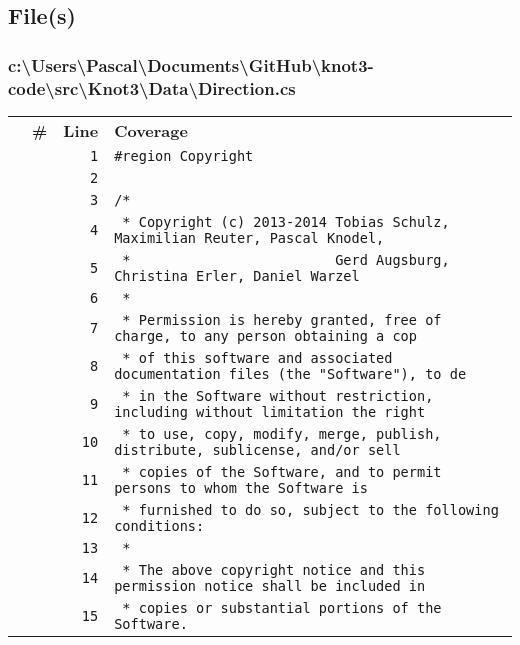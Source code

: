 \documentclass[a4paper,10pt]{article}
\begin{document}
\subsection{File(s)}
\subsubsection{c:\textbackslash Users\textbackslash Pascal\textbackslash Documents\textbackslash GitHub\textbackslash knot3-code\textbackslash src\textbackslash Knot3\textbackslash Data\textbackslash Direction.cs}
\begin{longtable}[l]{lrrl}
\textbf{} & \textbf{\#} & \textbf{Line} & \textbf{Coverage}\\
\cellcolor{gray} &  & \verb~1~ & \verb~#region Copyright~\\
\cellcolor{gray} &  & \verb~2~ & \verb~~\\
\cellcolor{gray} &  & \verb~3~ & \verb~/*~\\
\cellcolor{gray} &  & \verb~4~ & \verb~ * Copyright (c) 2013-2014 Tobias Schulz, Maximilian Reuter, Pascal Knodel,~\\
\cellcolor{gray} &  & \verb~5~ & \verb~ *                         Gerd Augsburg, Christina Erler, Daniel Warzel~\\
\cellcolor{gray} &  & \verb~6~ & \verb~ *~\\
\cellcolor{gray} &  & \verb~7~ & \verb~ * Permission is hereby granted, free of charge, to any person obtaining a cop~\\
\cellcolor{gray} &  & \verb~8~ & \verb~ * of this software and associated documentation files (the "Software"), to de~\\
\cellcolor{gray} &  & \verb~9~ & \verb~ * in the Software without restriction, including without limitation the right~\\
\cellcolor{gray} &  & \verb~10~ & \verb~ * to use, copy, modify, merge, publish, distribute, sublicense, and/or sell~\\
\cellcolor{gray} &  & \verb~11~ & \verb~ * copies of the Software, and to permit persons to whom the Software is~\\
\cellcolor{gray} &  & \verb~12~ & \verb~ * furnished to do so, subject to the following conditions:~\\
\cellcolor{gray} &  & \verb~13~ & \verb~ *~\\
\cellcolor{gray} &  & \verb~14~ & \verb~ * The above copyright notice and this permission notice shall be included in ~\\
\cellcolor{gray} &  & \verb~15~ & \verb~ * copies or substantial portions of the Software.~\\

\end{longtable}
\end{document}
